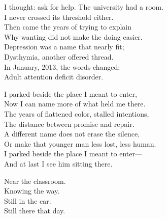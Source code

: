 \begin{lyrics}
I thought: ask for help. The university had a room.\\
I never crossed its threshold either.\\
Then came the years of trying to explain\\
Why wanting did not make the doing easier.\\
Depression was a name that nearly fit;\\
Dysthymia, another offered thread.\\
In January, 2013, the words changed:\\
Adult attention deficit disorder.

I parked beside the place I meant to enter,\\
Now I can name more of what held me there.\\
The years of flattened color, stalled intentions,\\
The distance between promise and repair.\\
A different name does not erase the silence,\\
Or make that younger man less lost, less human.\\
I parked beside the place I meant to enter—\\
And at last I see him sitting there.

Near the classroom.\\
Knowing the way.\\
Still in the car.\\
Still there that day.
\end{lyrics}

